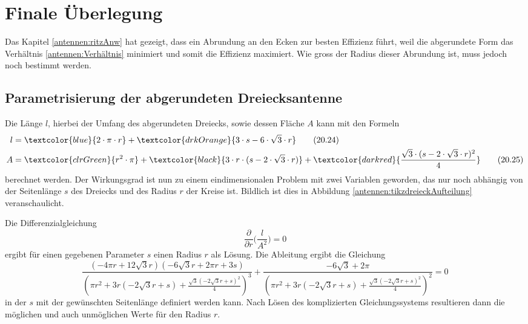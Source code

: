 %
%
% 
%
%
\section{Finale Überlegung\label{antennen:resultat}}

Das Kapitel \ref{antennen:ritzAnw} hat gezeigt, dass ein Abrundung an den Ecken
zur besten Effizienz führt, weil die abgerundete Form das Verhältnis \eqref{antennen:Verhältnis}
minimiert und somit die Effizienz maximiert. Wie gross der Radius dieser Abrundung
ist, muss jedoch noch bestimmt werden.


\subsection{Parametrisierung der abgerundeten Dreiecksantenne\label{antennen:param3eck}}
Die Länge $l$, hierbei der Umfang 
des abgerundeten Dreiecks, sowie dessen Fläche $A$ kann mit den Formeln
\begin{align}
	l &= \textcolor{blue}{2 \cdot \pi \cdot r} + \textcolor{drkOrange}{3 \cdot s - 6 \cdot \sqrt{3} \cdot r} \tag{20.24} \label{antennen:Länge} \\
	A &= \textcolor{clrGreen}{r^2 \cdot \pi} + \textcolor{black}{3 \cdot r \cdot (s - 2 \cdot \sqrt{3} \cdot r)} + \textcolor{darkred}{\frac{\sqrt{3} \cdot (s - 2 \cdot \sqrt{3} \cdot r)^2}{4}} \tag{20.25} \label{antennen:Fläche}
\end{align}\setcounter{equation}{25}%
berechnet werden.
Der Wirkungsgrad ist nun zu einem eindimensionalen Problem mit zwei Variablen geworden, das nur noch abhängig von 
der Seitenlänge $s$ des Dreiecks und des Radius $r$ der Kreise ist. Bildlich ist dies 
in Abbildung \ref{antennen:tikzdreieckAufteilung} veranschaulicht.


Die Differenzialgleichung
\begin{equation}
	\frac{\partial}{\partial{r}} \bigg(\frac{l}{A^2}\bigg)=0
	\label{antennen:Ableitung}
\end{equation}
ergibt für einen gegebenen Parameter $s$ einen Radius $r$ als Lösung. 
Die Ableitung ergibt die Gleichung 
\begin{equation}
	\frac{(- 4 \pi r + 12 \sqrt{3} r) (- 6 \sqrt{3} r + 2 \pi r + 3 s)}{\left(\pi r^{2} + 3 r (- 2 \sqrt{3} r + s) + \frac{\sqrt{3} \left(- 2 \sqrt{3} r + s\right)^{2}}{4}\right)^{3}} + \frac{- 6 \sqrt{3} + 2 \pi}{\left(\pi r^{2} + 3 r (- 2 \sqrt{3} r + s) + \frac{\sqrt{3} \left(- 2 \sqrt{3} r + s\right)^{2}}{4}\right)^{2}}=0
	\label{antennen:Ableitunggelöst}
\end{equation}
in der $s$ mit der gewünschten Seitenlänge definiert werden kann. Nach Lösen des komplizierten
Gleichungssystems resultieren dann die möglichen und auch unmöglichen Werte für den Radius $r$. 

